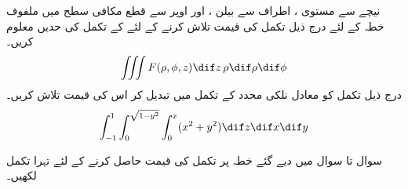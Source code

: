 نیچے سے مستوی ،  اطراف سے بیلن ، اور اوپر سے قطع مکافی سطح  میں ملفوف خطہ  کے لئے درج ذیل تکمل کی قیمت تلاش کرنے کے لئے  کے تکمل کی  حدیں معلوم کریں۔
\begin{align*}
\iiint F(\rho,\phi,z)\dif z\,\rho \dif \rho\dif\phi
\end{align*}
درج ذیل تکمل کو معادل نلکی محدد کے تکمل میں تبدیل کر  اس کی قیمت تلاش کریں۔
\begin{align*}
\int_{-1}^1 \int_0^{\sqrt{1-y^2}}\int_0^x (x^2+y^2)\dif z\dif x\dif y
\end{align*}

سوال  تا سوال   میں دیے گئے خطہ  پر تکمل  کی قیمت حاصل کرنے کے لئے تہرا تکمل لکھیں۔

